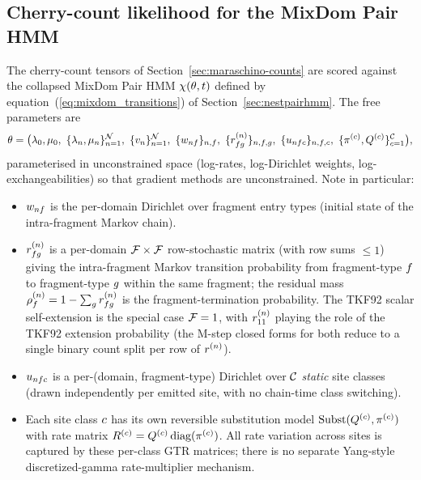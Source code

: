 \subsection{Cherry-count likelihood for the MixDom Pair HMM}
\label{sec:maraschino-fit}

The cherry-count tensors of Section~\ref{sec:maraschino-counts} are
scored against the collapsed MixDom Pair HMM
$\chi(\theta,t)$ defined by
equation~(\ref{eq:mixdom_transitions}) of Section~\ref{sec:nestpairhmm}.
The free parameters are
\[
\theta = \big(\lambda_0, \mu_0,\
\{\lambda_n, \mu_n\}_{n=1}^{\mathcal{N}},\
\{v_n\}_{n=1}^{\mathcal{N}},\
\{w_{nf}\}_{n,f},\
\{r^{(n)}_{fg}\}_{n,f,g},\
\{u_{nfc}\}_{n,f,c},\
\{\pi^{(c)}, Q^{(c)}\}_{c=1}^{\mathcal{C}}\big),
\]
parameterised in unconstrained space (log-rates, log-Dirichlet
weights, log-exchangeabilities) so that gradient methods are
unconstrained. Note in particular:
\begin{itemize}[nosep]
\item $w_{nf}$ is the per-domain Dirichlet over fragment
  entry types (initial state of the intra-fragment Markov chain).
\item $r^{(n)}_{fg}$ is a per-domain
  $\mathcal{F} \times \mathcal{F}$ row-stochastic matrix (with row sums $\leq 1$)
  giving the intra-fragment Markov transition probability from
  fragment-type $f$ to fragment-type $g$ within the
  same fragment; the residual mass
  $\rho^{(n)}_f = 1 - \sum_g r^{(n)}_{fg}$
  is the fragment-termination probability. The TKF92 scalar
  self-extension is the special case $\mathcal{F}=1$, with
  $r^{(n)}_{11}$ playing the role of the TKF92 extension
  probability (the M-step closed forms for both reduce to a single
  binary count split per row of $r^{(n)}$).
\item $u_{nfc}$ is a per-(domain, fragment-type)
  Dirichlet over $\mathcal{C}$ \emph{static} site classes (drawn
  independently per emitted site, with no chain-time class switching).
\item Each site class $c$ has its own reversible substitution
  model ${\mbox{Subst}}(Q^{(c)}, \pi^{(c)})$ with rate matrix
  $R^{(c)} = Q^{(c)}\,{\mbox{diag}}(\pi^{(c)})$.
  All rate variation across sites is captured by these per-class GTR
  matrices; there is no separate Yang-style discretized-gamma
  rate-multiplier mechanism.
\end{itemize}

